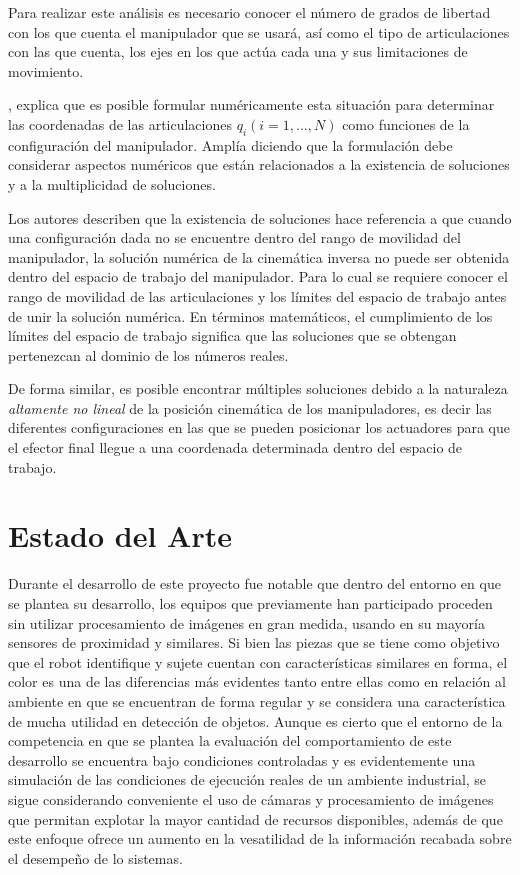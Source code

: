 Para realizar este análisis es necesario conocer el número de grados de libertad con los que cuenta el manipulador que se usará, así como el tipo de articulaciones con las que cuenta, los ejes en los que actúa cada una y sus limitaciones de movimiento.

\cite{ceccarelli_fundamentals_2022}, explica que es posible formular numéricamente esta situación para determinar las coordenadas de las articulaciones $q_{i}(i=1,...,N)$ como funciones de la configuración del manipulador. Amplía diciendo que la formulación debe considerar aspectos numéricos que están relacionados a la existencia de soluciones  y a la multiplicidad de soluciones.

Los autores describen que la existencia de soluciones hace referencia a que cuando una configuración dada no se encuentre dentro del rango de movilidad del manipulador, la solución numérica de la cinemática inversa no puede ser obtenida dentro del espacio de trabajo del manipulador. Para lo cual se requiere conocer el rango de movilidad de las articulaciones y los límites del espacio de trabajo antes de unir la solución numérica. En términos matemáticos, el cumplimiento de los límites del espacio de trabajo significa que las soluciones que se obtengan pertenezcan al dominio de los números reales.

De forma similar, es posible encontrar múltiples soluciones  debido a la naturaleza \textit{altamente no lineal} de la posición cinemática de los manipuladores, es decir las diferentes configuraciones en las que se pueden posicionar los actuadores para que el efector final llegue a una coordenada determinada dentro del espacio de trabajo. 

\section{Estado del Arte}

Durante el desarrollo de este proyecto fue notable que dentro del entorno en que se plantea su desarrollo, los equipos que previamente han participado proceden sin utilizar procesamiento de imágenes en gran medida, usando en su mayoría sensores de proximidad y similares. Si bien las piezas que se tiene como objetivo que el robot identifique y sujete cuentan con características similares en forma, el color es una de las diferencias más evidentes tanto entre ellas como en relación al ambiente en que se encuentran de forma regular y se considera una característica de mucha utilidad en detección de objetos. Aunque es cierto que el entorno de la competencia en que se plantea la evaluación del comportamiento de este desarrollo se encuentra bajo condiciones controladas y es evidentemente una simulación de las condiciones de ejecución reales de un ambiente industrial, se sigue considerando conveniente el uso de cámaras y procesamiento de imágenes que permitan explotar la mayor cantidad de recursos disponibles, además de que este enfoque ofrece un aumento en la vesatilidad de la información recabada sobre el desempeño de lo sistemas.


